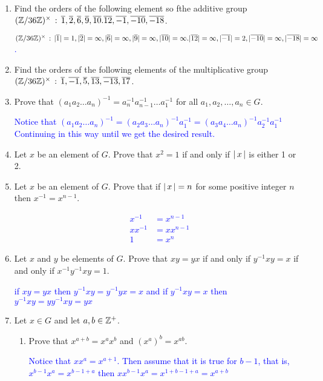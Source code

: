 \documentclass[10pt,a4paper]{report}
\newcommand{\BLUE}[1]{\textcolor{blue}{#1}}
\begin{document}
\begin{enumerate}
	\item Find the orders of the following element so fthe additive group $(\mathbb{Z}/36\mathbb{Z})^\times\,:\, \overline{1}, \overline{2},\overline{6},\overline{9},\overline{10}.\overline{12},\overline{-1}, \overline{-10}, \overline{-18}$.
	
	\BLUE{$(\mathbb{Z}/36\mathbb{Z})^\times\,:\, |\overline{1}|=1, |\overline{2}|=\infty,|\overline{6}|=\infty,|\overline{9}|=\infty,|\overline{10}|=\infty.|\overline{12}|=\infty,|\overline{-1}|=2, |\overline{-10}|=\infty, |\overline{-18}|=\infty$.}
	
	\item Find the orders of the following elements of the multiplicative group $(\mathbb{Z}/36\mathbb{Z})^\times\,:\, \overline{1}, \overline{-1}, \overline{5}, \overline{13},\overline{-13},\overline{17}$.
	
	\item Prove that $(a_1a_2\dots a_n)^{-1}=a_n^{-1}a_{n-1}^{-1}\dots a_1^{-1}$ for all $a_1, a_2, \dots, a_n \in G$.
	
	\BLUE{Notice that $(a_1a_2\dots a_n)^{-1} = (a_2a_3\dots a_n)^{-1}a_1^{-1} = (a_3a_4\dots a_n)^{-1}a_2^{-1}a_1^{-1}$  Continuing in this way until we get the desired result.
	}
	
	\item Let $x$ be an element of $G$.  Prove that $x^2=1$ if and only if $\left |\, x \,\right |$ is either 1 or 2.
	
	\item Let $x$ be an element of $G$.  Prove that if $\left |\, x \,\right |=n$  for some positive integer $n$ then $x^{-1}=x^{n-1}$.
	
	\BLUE{\begin{align*}
		x^{-1}&=x^{n-1}\\
		xx^{-1}&=xx^{n-1}\\
		1&=x^n
	\end{align*}
	}
	
	\item Let $x$ and $y$ be elements of $G$.  Prove that $xy=yx$ if and only if $y^{-1}xy=x$ if and only if $x^{-1}y^{-1}xy=1$.
	
	\BLUE{if $xy=yx$ then $y^{-1}xy=y^{-1}yx=x$ and if $y^{-1}xy=x$ then $y^{-1}xy=yy^{-1}xy=yx$
	}
	
	\item Let $x \in G$ and let $a,b \in \mathbb{Z}^+$.
	\begin{enumerate}
		\item Prove that $x^{a+b}=x^ax^b$ and $(x^a)^b=x^{ab}$.
		
		\BLUE{Notice that $xx^a = x^{a+1}$.  Then assume that it is true for $b-1$, that is, $x^{b-1}x^a = x^{b-1+a}$ then $xx^{b-1}x^a = x^{1+b-1+a}=x^{a+b}$
		}
		

\end{enumerate}
\end{enumerate}
\end{document}
